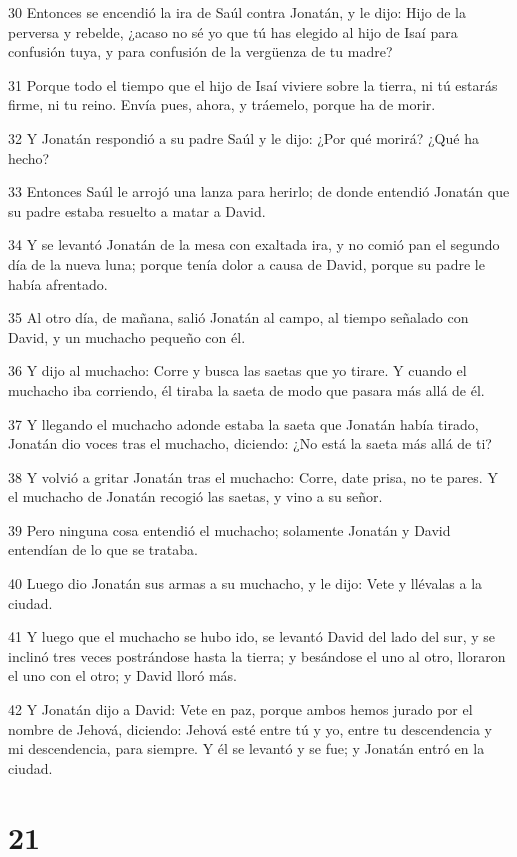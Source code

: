 \par 30 Entonces se encendió la ira de Saúl contra Jonatán, y le dijo: Hijo de la perversa y rebelde, ¿acaso no sé yo que tú has elegido al hijo de Isaí para confusión tuya, y para confusión de la vergüenza de tu madre?
\par 31 Porque todo el tiempo que el hijo de Isaí viviere sobre la tierra, ni tú estarás firme, ni tu reino. Envía pues, ahora, y tráemelo, porque ha de morir.
\par 32 Y Jonatán respondió a su padre Saúl y le dijo: ¿Por qué morirá? ¿Qué ha hecho?
\par 33 Entonces Saúl le arrojó una lanza para herirlo; de donde entendió Jonatán que su padre estaba resuelto a matar a David.
\par 34 Y se levantó Jonatán de la mesa con exaltada ira, y no comió pan el segundo día de la nueva luna; porque tenía dolor a causa de David, porque su padre le había afrentado.
\par 35 Al otro día, de mañana, salió Jonatán al campo, al tiempo señalado con David, y un muchacho pequeño con él.
\par 36 Y dijo al muchacho: Corre y busca las saetas que yo tirare. Y cuando el muchacho iba corriendo, él tiraba la saeta de modo que pasara más allá de él.
\par 37 Y llegando el muchacho adonde estaba la saeta que Jonatán había tirado, Jonatán dio voces tras el muchacho, diciendo: ¿No está la saeta más allá de ti?
\par 38 Y volvió a gritar Jonatán tras el muchacho: Corre, date prisa, no te pares. Y el muchacho de Jonatán recogió las saetas, y vino a su señor.
\par 39 Pero ninguna cosa entendió el muchacho; solamente Jonatán y David entendían de lo que se trataba.
\par 40 Luego dio Jonatán sus armas a su muchacho, y le dijo: Vete y llévalas a la ciudad.
\par 41 Y luego que el muchacho se hubo ido, se levantó David del lado del sur, y se inclinó tres veces postrándose hasta la tierra; y besándose el uno al otro, lloraron el uno con el otro; y David lloró más.
\par 42 Y Jonatán dijo a David: Vete en paz, porque ambos hemos jurado por el nombre de Jehová, diciendo: Jehová esté entre tú y yo, entre tu descendencia y mi descendencia, para siempre. Y él se levantó y se fue; y Jonatán entró en la ciudad.

\chapter{21}

